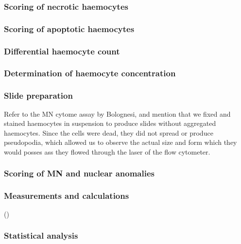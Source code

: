 \subsubsection{Scoring of necrotic haemocytes}

\subsubsection{Scoring of apoptotic haemocytes}

\subsubsection{Differential haemocyte count}

\subsubsection{Determination of haemocyte concentration}

\subsubsection{Slide preparation}
Refer to the MN cytome assay by Bolognesi, and mention that we fixed and stained haemocytes in suspension to produce slides without aggregated haemocytes. Since the cells were dead, they did not spread or produce pseudopodia, which allowed us to observe the actual size and form which they would posses ass they flowed through the laser of the flow cytometer.

\subsubsection{Scoring of MN and nuclear anomalies}

\subsubsection{Measurements and calculations}
(\cite{R-project})

\subsubsection{Statistical analysis}
